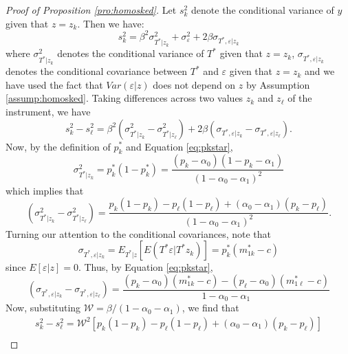 \begin{proof}[Proof of Proposition \ref{pro:homosked}]
  Let $s^2_k$ denote the conditional variance of $y$ given that $z=z_k$.
  Then we have:
\begin{equation}
  s_k^2 = \beta^2 \sigma^2_{T^*|z_k} + \sigma^2_\varepsilon + 2\beta \sigma_{T^*,\varepsilon|z_k}
\end{equation}
where $\sigma^2_{T^*|z_k}$ denotes the conditional variance of $T^*$ given that $z = z_k$, $\sigma_{T^*,\varepsilon|z_k}$ denotes the conditional covariance between $T^*$ and $\varepsilon$ given that $z=z_k$ and we have used the fact that $Var(\varepsilon|z)$ does not depend on $z$ by Assumption \ref{assump:homosked}.
Taking differences across two values $z_k$ and $z_\ell$ of the instrument, we have
\begin{equation}
  s^2_k - s^2_\ell = \beta^2\left( \sigma^2_{T^*|z_k} - \sigma^2_{T^*|z_\ell} \right) + 2\beta \left( \sigma_{T^*,\varepsilon|z_k} - \sigma_{T^*,\varepsilon|z_\ell} \right).
\end{equation}
Now, by the definition of $p^*_k$ and Equation \ref{eq:pkstar},
\begin{equation}
  \sigma^2_{T^*|z_k}= p^*_k (1-p^*_k) = \frac{(p_k - \alpha_0)(1 - p_k - \alpha_1)}{(1 - \alpha_0 - \alpha_1)^2} 
\end{equation}
which implies that 
\begin{equation}
  \left( \sigma^2_{T^*|z_k} - \sigma^2_{T^*|z_\ell} \right)= \frac{p_k(1-p_k) - p_\ell(1-p_\ell) + (\alpha_0 - \alpha_1)(p_k - p_\ell)}{(1 - \alpha_0 - \alpha_1)^2}.
\end{equation}
Turning our attention to the conditional covariances, note that
\begin{equation}
  \sigma_{T^*,\varepsilon|z_k} = E_{T^*|z}\left[E\left( T^*\varepsilon|T^*z_k \right)  \right] = p_k^* (m^*_{1k}-c) 
\end{equation}
since $E[\varepsilon|z] = 0$.
Thus, by Equation \ref{eq:pkstar},
\begin{equation}
  \left( \sigma_{T^*,\varepsilon|z_k} - \sigma_{T^*,\varepsilon|z_\ell} \right) = \frac{(p_k - \alpha_0)(m^*_{1k}-c) - (p_\ell - \alpha_0)(m^*_{1\ell}-c)}{1 - \alpha_0 - \alpha_1} 
\end{equation}
Now, substituting $\mathcal{W} = \beta/(1-\alpha_0-\alpha_1)$, we find that
\begin{align*}
  s^2_k - s^2_\ell = \mathcal{W}^2\left[p_k(1-p_k) - p_\ell(1-p_\ell) + (\alpha_0 - \alpha_1)(p_k - p_\ell)\right]\\  

\end{align*}
\end{proof}
